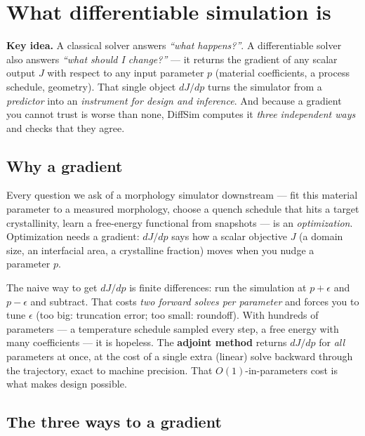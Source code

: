 \chapter{What differentiable simulation is}
\label{ch:d1}

\begin{keybox}
\textbf{Key idea.} A classical solver answers \emph{``what happens?''}.
A differentiable solver also answers \emph{``what should I change?''} ---
it returns the gradient of any scalar output $J$ with respect to any
input parameter $p$ (material coefficients, a process schedule,
geometry). That single object $dJ/dp$ turns the simulator from a
\emph{predictor} into an \emph{instrument for design and inference}. And
because a gradient you cannot trust is worse than none, DiffSim computes
it \emph{three independent ways} and checks that they agree.
\end{keybox}

\section{Why a gradient}

Every question we ask of a morphology simulator downstream --- fit this
material parameter to a measured morphology, choose a quench schedule
that hits a target crystallinity, learn a free-energy functional from
snapshots --- is an \emph{optimization}. Optimization needs a gradient:
$dJ/dp$ says how a scalar objective $J$ (a domain size, an interfacial
area, a crystalline fraction) moves when you nudge a parameter $p$.

The naive way to get $dJ/dp$ is finite differences: run the simulation
at $p+\epsilon$ and $p-\epsilon$ and subtract. That costs \emph{two
forward solves per parameter} and forces you to tune $\epsilon$ (too big:
truncation error; too small: roundoff). With hundreds of parameters --- a
temperature schedule sampled every step, a free energy with many
coefficients --- it is hopeless. The \textbf{adjoint method} returns
$dJ/dp$ for \emph{all} parameters at once, at the cost of a single extra
(linear) solve backward through the trajectory, exact to machine
precision. That $O(1)$-in-parameters cost is what makes design possible.

\section{The three ways to a gradient}

